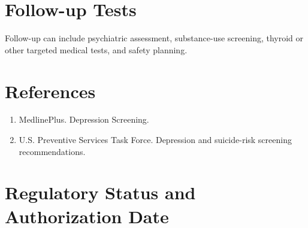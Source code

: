 \section*{Follow-up Tests} Follow-up can include psychiatric assessment, substance-use screening, thyroid or other targeted medical tests, and safety planning.
\section*{References} \begin{enumerate}\item MedlinePlus. Depression Screening.\item U.S. Preventive Services Task Force. Depression and suicide-risk screening recommendations.\end{enumerate}
\clearpage\section*{Regulatory Status and Authorization Date}\clearpage
